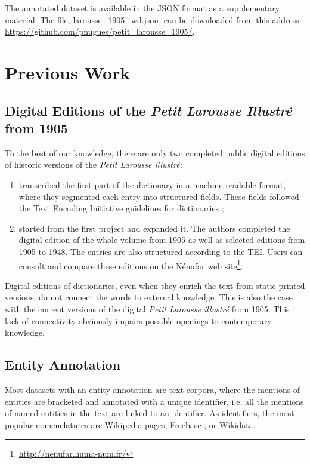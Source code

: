 \documentclass[10pt, a4paper]{article}
\begin{document}
The annotated dataset is available in the JSON format as a supplementary material. The file, \url{larousse_1905_wd.json}, can be downloaded from this address: \url{https://github.com/pnugues/petit_larousse_1905/}.

\section{Previous Work}
\subsection{Digital Editions of the \textit{Petit Larousse Illustré} from 1905}
To the best of our knowledge, there are only two completed public digital editions of historic versions of the \textit{Petit Larousse illustré:}
\begin{enumerate}
    \item {} transcribed the first part of the dictionary in a machine-readable format, where they segmented each entry into structured fields. These fields followed the Text Encoding Initiative guidelines for dictionaries \cite{TEI2021};
    \item {} started from the first project and expanded it. The authors completed the digital edition of the whole volume from 1905 as well as selected editions from 1905 to 1948. The entries are also structured according to the TEI. Users can consult and compare these editions on the Nénufar web site\footnote{\url{http://nenufar.huma-num.fr/}}.
\end{enumerate}

Digital editions of dictionaries, even when they enrich the text from static printed versions, do not connect the words to external knowledge. This is also the case with the current versions of the digital \textit{Petit Larousse illustré} from 1905. This lack of connectivity obviously impairs possible openings to contemporary knowledge. 

\subsection{Entity Annotation}
Most datasets with an entity annotation are text corpora, where the mentions of entities are bracketed and annotated with a unique identifier, i.e. all the mentions of named entities in the text are linked to an identifier. As identifiers, the most popular nomenclatures are Wikipedia pages, Freebase \cite{Bollacker2008}, or Wikidata.
\end{document}
